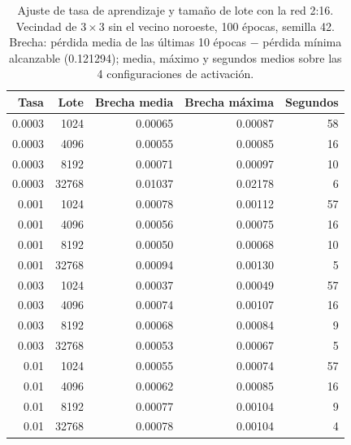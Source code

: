 \begin{table}[H]
	\centering
	\small
	\begin{tabular}{rrrrr}
		\toprule
		\textbf{Tasa} & \textbf{Lote} & \textbf{Brecha media} & \textbf{Brecha máxima} & \textbf{Segundos} \\
		\midrule
		0.0003 & 1024 & 0.00065 & 0.00087 & 58 \\
		0.0003 & 4096 & 0.00055 & 0.00085 & 16 \\
		0.0003 & 8192 & 0.00071 & 0.00097 & 10 \\
		0.0003 & 32768 & 0.01037 & 0.02178 & 6 \\
		\midrule
		0.001 & 1024 & 0.00078 & 0.00112 & 57 \\
		0.001 & 4096 & 0.00056 & 0.00075 & 16 \\
		0.001 & 8192 & 0.00050 & 0.00068 & 10 \\
		0.001 & 32768 & 0.00094 & 0.00130 & 5 \\
		\midrule
		0.003 & 1024 & 0.00037 & 0.00049 & 57 \\
		0.003 & 4096 & 0.00074 & 0.00107 & 16 \\
		0.003 & 8192 & 0.00068 & 0.00084 & 9 \\
		0.003 & 32768 & 0.00053 & 0.00067 & 5 \\
		\midrule
		0.01 & 1024 & 0.00055 & 0.00074 & 57 \\
		0.01 & 4096 & 0.00062 & 0.00085 & 16 \\
		0.01 & 8192 & 0.00077 & 0.00104 & 9 \\
		0.01 & 32768 & 0.00078 & 0.00104 & 4 \\
		\bottomrule
	\end{tabular}
	\caption{Ajuste de tasa de aprendizaje y tamaño de lote con la red 2:16. Vecindad de $3\times3$ sin el vecino noroeste, 100 épocas, semilla 42. Brecha: pérdida media de las últimas 10 épocas $-$ pérdida mínima alcanzable (0.121294); media, máximo y segundos medios sobre las 4 configuraciones de activación.}
	\label{tab:vecindad_ajuste_2x16}
\end{table}

